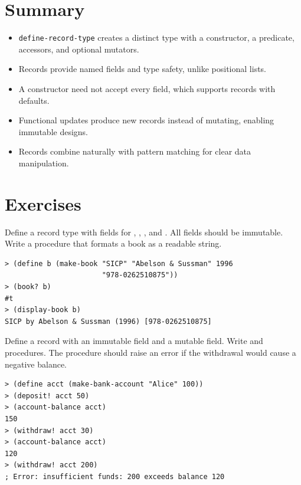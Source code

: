 \section*{Summary}

\begin{itemize}
    \item \texttt{define-record-type} creates a distinct type with a constructor, a predicate, accessors, and optional mutators.
    \item Records provide named fields and type safety, unlike positional lists.
    \item A constructor need not accept every field, which supports records with defaults.
    \item Functional updates produce new records instead of mutating, enabling immutable designs.
    \item Records combine naturally with pattern matching for clear data manipulation.
\end{itemize}

\section*{Exercises}

\begin{exercise}
Define a  record type with fields for , , , and . All fields should be immutable. Write a  procedure that formats a book as a readable string.

\begin{lstlisting}[style=repl]
> (define b (make-book "SICP" "Abelson & Sussman" 1996
                       "978-0262510875"))
> (book? b)
#t
> (display-book b)
SICP by Abelson & Sussman (1996) [978-0262510875]
\end{lstlisting}
\end{exercise}

\begin{exercise}
Define a  record with an immutable  field and a mutable  field. Write  and  procedures. The  procedure should raise an error if the withdrawal would cause a negative balance.

\begin{lstlisting}[style=repl]
> (define acct (make-bank-account "Alice" 100))
> (deposit! acct 50)
> (account-balance acct)
150
> (withdraw! acct 30)
> (account-balance acct)
120
> (withdraw! acct 200)
; Error: insufficient funds: 200 exceeds balance 120
\end{lstlisting}
\end{exercise}

